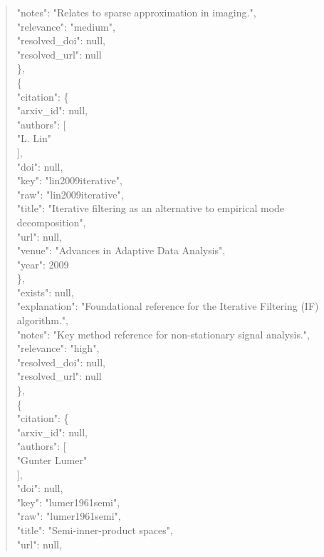 \documentclass[11pt]{article}
\begin{document}
\begin{quote}
      "notes": "Relates to sparse approximation in imaging.",\\
      "relevance": "medium",\\
      "resolved\_doi": null,\\
      "resolved\_url": null\\
    \},\\
    \{\\
      "citation": \{\\
        "arxiv\_id": null,\\
        "authors": [\\
          "L. Lin"\\
        ],\\
        "doi": null,\\
        "key": "lin2009iterative",\\
        "raw": "lin2009iterative",\\
        "title": "Iterative filtering as an alternative to empirical mode decomposition",\\
        "url": null,\\
        "venue": "Advances in Adaptive Data Analysis",\\
        "year": 2009\\
      \},\\
      "exists": null,\\
      "explanation": "Foundational reference for the Iterative Filtering (IF) algorithm.",\\
      "notes": "Key method reference for non-stationary signal analysis.",\\
      "relevance": "high",\\
      "resolved\_doi": null,\\
      "resolved\_url": null\\
    \},\\
    \{\\
      "citation": \{\\
        "arxiv\_id": null,\\
        "authors": [\\
          "Gunter Lumer"\\
        ],\\
        "doi": null,\\
        "key": "lumer1961semi",\\
        "raw": "lumer1961semi",\\
        "title": "Semi-inner-product spaces",\\
        "url": null,\\

\end{quote}
\end{document}
